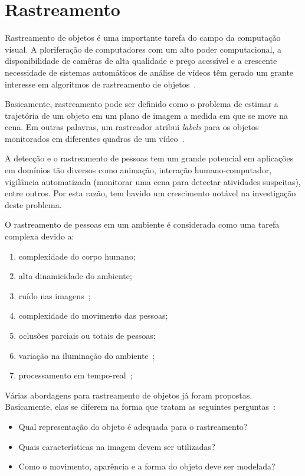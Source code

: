 \section {Rastreamento}	

	Rastreamento de objetos é uma importante tarefa do campo da computação visual. A ploriferação de computadores com um alto poder computacional, a disponibilidade de camêras de alta qualidade e preço acessível e a crescente necessidade de sistemas automáticos de análise de vídeos têm gerado um grante interesse em algoritmos de rastreamento de objetos~\cite{yilmaz}.

	Basicamente, rastreamento pode ser definido como o problema de estimar a trajetória de um objeto em um plano de imagem a medida em que se move na cena. Em outras palavras, um rastreador atribui \textit{labels} para os objetos monitorados em diferentes quadros de um vídeo~\cite{yilmaz}.

	A detecção e o rastreamento de pessoas tem um grande potencial em aplicações em domínios tão diversos como animação, interação humano-computador, vigilância automatizada (monitorar uma cena para detectar atividades suspeitas), entre outros. Por esta razão, tem havido um crescimento notável na investigação deste problema.

	O rastreamento de pessoas em um ambiente é considerada como uma tarefa complexa devido a:

		\begin{enumerate}
			\item complexidade do corpo humano;
			\item alta dinamicidade do ambiente;
			\item ruído nas imagens~\cite{yilmaz};
			\item complexidade do movimento das pessoas;
			\item oclusões parciais ou totais de pessoas;
			\item variação na iluminação do ambiente~\cite{yilmaz};
			\item processamento em tempo-real~\cite{yilmaz};
		\end{enumerate}

	Várias abordagens para rastreamento de objetos já foram propostas. Basicamente, elas se diferem na forma que tratam as seguintes perguntas~\cite{yilmaz}: 
		
		\begin{itemize}
			\item Qual representação do objeto é adequada para o rastreamento?
			\item Quais características na imagem devem ser utilizadas?
			\item Como o movimento, aparência e a forma do objeto deve ser modelada? 
		\end{itemize}

